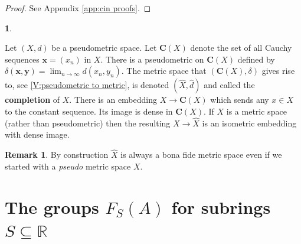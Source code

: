 \documentclass[12pt]{amsart}
\theoremstyle{definition}
\newtheorem{void}[prop]{}
\newtheorem{remark}[prop]{Remark}
\def\RR{\ensuremath{\mathbb{R}}}
\newcommand{\B}[1]{\mathbf{#1}}
\def\Free{F}
\begin{document}
\begin{proof}
See Appendix \ref{app:cin proofs}.

\end{proof}



\begin{void}\label{V:completions}


Let $(X,d)$ be a pseudometric space.
Let $\B C(X)$ denote the set of all Cauchy sequences $\B x =(x_n)$ in $X$.
There is a pseudometric on $\B C(X)$ defined by $\delta(\B x,\B y) = \lim_{n \to \infty} d(x_n,y_n)$.
The metric space that $(\B C(X), \delta)$ gives rise to, see \ref {V:pseudometric to metric}, is denoted $(\widehat{X},\widehat{d})$ and called the {\bf completion} of $X$.
There is an embedding $X \to \B C(X)$ which sends any $x \in X$ to the constant sequence.
Its image is dense in $\B C(X)$.
If $X$ is a metric space (rather than pseudometric) then the resulting $X \to \widehat{X}$ is an isometric embedding with dense image.
\end{void}

\begin{remark}
By construction $\widehat{X}$ is always a bona fide metric space even if we started with a {\em pseudo} metric space $X$.
\end{remark}








\section{The groups $\Free_S(A)$ for subrings $S \subseteq \RR$}\label{sec:FSA}
\end{document}
